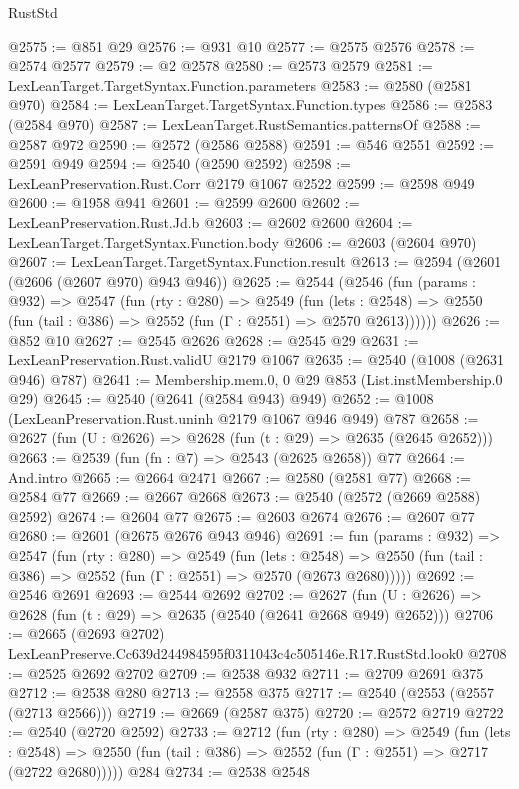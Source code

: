 \begin{lexlean}{RustStd}
\begin{coremodule}
@2575 := @851 @29
@2576 := @931 @10
@2577 := @2575 @2576
@2578 := @2574 @2577
@2579 := @2 @2578
@2580 := @2573 @2579
@2581 := LexLeanTarget.TargetSyntax.Function.parameters
@2583 := @2580 (@2581 @970)
@2584 := LexLeanTarget.TargetSyntax.Function.types
@2586 := @2583 (@2584 @970)
@2587 := LexLeanTarget.RustSemantics.patternsOf
@2588 := @2587 @972
@2590 := @2572 (@2586 @2588)
@2591 := @546 @2551
@2592 := @2591 @949
@2594 := @2540 (@2590 @2592)
@2598 := LexLeanPreservation.Rust.Corr @2179 @1067 @2522
@2599 := @2598 @949
@2600 := @1958 @941
@2601 := @2599 @2600
@2602 := LexLeanPreservation.Rust.Jd.b
@2603 := @2602 @2600
@2604 := LexLeanTarget.TargetSyntax.Function.body
@2606 := @2603 (@2604 @970)
@2607 := LexLeanTarget.TargetSyntax.Function.result
@2613 := @2594 (@2601 (@2606 (@2607 @970) @943 @946))
@2625 := @2544
    (@2546
      (fun (params : @932) =>
      @2547
        (fun (rty : @280) =>
        @2549
          (fun (lets : @2548) =>
          @2550 (fun (tail : @386) => @2552 (fun (Γ : @2551) => @2570 @2613))))))
@2626 := @852 @10
@2627 := @2545 @2626
@2628 := @2545 @29
@2631 := LexLeanPreservation.Rust.validU @2179 @1067
@2635 := @2540 (@1008 (@2631 @946) @787)
@2641 := Membership.mem.{0, 0} @29 @853 (List.instMembership.{0} @29)
@2645 := @2540 (@2641 (@2584 @943) @949)
@2652 := @1008 (LexLeanPreservation.Rust.uninh @2179 @1067 @946 @949) @787
@2658 := @2627 (fun (U : @2626) => @2628 (fun (t : @29) => @2635 (@2645 @2652)))
@2663 := @2539 (fun (fn : @7) => @2543 (@2625 @2658)) @77
@2664 := And.intro
@2665 := @2664 @2471
@2667 := @2580 (@2581 @77)
@2668 := @2584 @77
@2669 := @2667 @2668
@2673 := @2540 (@2572 (@2669 @2588) @2592)
@2674 := @2604 @77
@2675 := @2603 @2674
@2676 := @2607 @77
@2680 := @2601 (@2675 @2676 @943 @946)
@2691 := fun (params : @932) =>
  @2547
    (fun (rty : @280) =>
    @2549
      (fun (lets : @2548) =>
      @2550 (fun (tail : @386) => @2552 (fun (Γ : @2551) => @2570 (@2673 @2680)))))
@2692 := @2546 @2691
@2693 := @2544 @2692
@2702 := @2627 (fun (U : @2626) => @2628 (fun (t : @29) => @2635 (@2540 (@2641 @2668 @949) @2652)))
@2706 := @2665 (@2693 @2702) LexLeanPreserve.Cc639d244984595f0311043c4c505146e.R17.RustStd.look0
@2708 := @2525 @2692 @2702
@2709 := @2538 @932
@2711 := @2709 @2691 @375
@2712 := @2538 @280
@2713 := @2558 @375
@2717 := @2540 (@2553 (@2557 (@2713 @2566)))
@2719 := @2669 (@2587 @375)
@2720 := @2572 @2719
@2722 := @2540 (@2720 @2592)
@2733 := @2712
    (fun (rty : @280) =>
    @2549
      (fun (lets : @2548) =>
      @2550 (fun (tail : @386) => @2552 (fun (Γ : @2551) => @2717 (@2722 @2680)))))
    @284
@2734 := @2538 @2548

\end{coremodule}
\end{lexlean}
